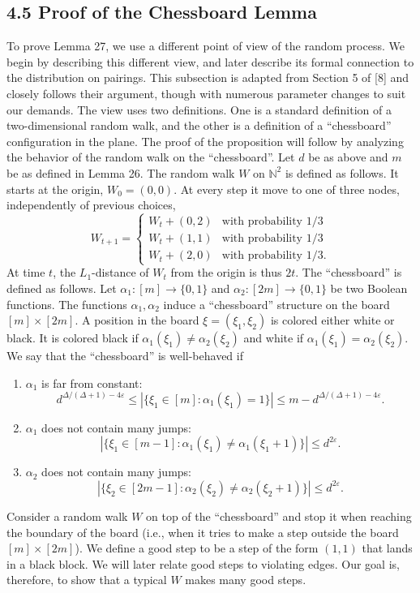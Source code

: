 \subsection*{4.5 Proof of the Chessboard Lemma}
To prove Lemma 27, we use a different point of view of the random process. We begin by describing this different view, and later describe its formal connection to the distribution on pairings. This subsection is adapted from Section 5 of [8] and closely follows their argument, though with numerous parameter changes to suit our demands.
The view uses two definitions. One is a standard definition of a two-dimensional random walk, and the other is a definition of a ``chessboard'' configuration in the plane. The proof of the proposition will follow by analyzing the behavior of the random walk on the ``chessboard''. Let $d$ be as above and $m$ be as defined in Lemma 26. The random walk $W$ on $\mathbb N^2$ is defined as follows. It starts at the origin, $W_0=(0,0)$. At every step it move to one of three nodes, independently of previous choices,
\[W_{t+1}=\begin{cases}W_t+(0,2)&\text{with probability }1/3\\W_t+(1,1)&\text{with probability }1/3\\W_t+(2,0)&\text{with probability }1/3.\end{cases}\]
At time $t$, the $L_1$-distance of $W_t$ from the origin is thus $2t$.
The ``chessboard'' is defined as follows. Let $\alpha_1:[m]\to\{0,1\}$ and $\alpha_2:[2m]\to\{0,1\}$ be two Boolean functions. The functions $\alpha_1,\alpha_2$ induce a ``chessboard'' structure on the board $[m]\times[2m]$. A position in the board $\xi=(\xi_1,\xi_2)$ is colored either white or black. It is colored black if $\alpha_1(\xi_1)\neq\alpha_2(\xi_2)$ and white if $\alpha_1(\xi_1)=\alpha_2(\xi_2)$. We say that the ``chessboard'' is well-behaved if
\begin{enumerate}
\item $\alpha_1$ is far from constant:
\[d^{\Delta/(\Delta+1)-4\varepsilon}\leq|\{\xi_1\in[m]:\alpha_1(\xi_1)=1\}|\leq m-d^{\Delta/(\Delta+1)-4\varepsilon}.\]
\item $\alpha_1$ does not contain many jumps:
\[|\{\xi_1\in[m-1]:\alpha_1(\xi_1)\neq\alpha_1(\xi_1+1)\}|\leq d^{2\varepsilon}.\]
\item $\alpha_2$ does not contain many jumps:
\[|\{\xi_2\in[2m-1]:\alpha_2(\xi_2)\neq\alpha_2(\xi_2+1)\}|\leq d^{2\varepsilon}.\]
\end{enumerate}
Consider a random walk $W$ on top of the ``chessboard'' and stop it when reaching the boundary of the board (i.e., when it tries to make a step outside the board $[m]\times[2m]$). We define a good step to be a step of the form $(1,1)$ that lands in a black block. We will later relate good steps to violating edges. Our goal is, therefore, to show that a typical $W$ makes many good steps.

